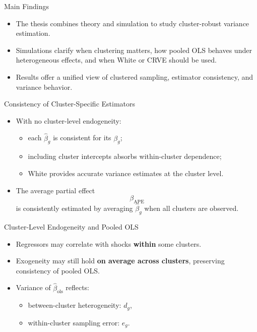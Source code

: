 \documentclass[
  ignorenonframetext,
]{beamer}
\providecommand{\tightlist}{%
  \setlength{\itemsep}{0pt}\setlength{\parskip}{0pt}}
\begin{document}
\begin{frame}{Main Findings}
\label{main-findings}
\begin{itemize}
\tightlist
\item
  The thesis combines theory and simulation to study cluster-robust
  variance estimation.\\
\item
  Simulations clarify when clustering matters, how pooled OLS behaves
  under heterogeneous effects, and when White or CRVE should be used.\\
\item
  Results offer a unified view of clustered sampling, estimator
  consistency, and variance behavior.
\end{itemize}
\end{frame}

\begin{frame}{Consistency of Cluster-Specific Estimators}
\label{consistency-of-cluster-specific-estimators}
\begin{itemize}
\tightlist
\item
  With no cluster-level endogeneity:

  \begin{itemize}
  \tightlist
  \item
    each \(\hat{\beta}_g\) is consistent for its \(\beta_g\);\\
  \item
    including cluster intercepts absorbs within-cluster dependence;\\
  \item
    White provides accurate variance estimates at the cluster level.
  \end{itemize}
\item
  The average partial effect\\
  \[
  \beta_{\text{APE}}
  \] is consistently estimated by averaging \(\hat{\beta}_g\) when all
  clusters are observed.
\end{itemize}
\end{frame}

\begin{frame}{Cluster-Level Endogeneity and Pooled OLS}
\label{cluster-level-endogeneity-and-pooled-ols}
\begin{itemize}
\tightlist
\item
  Regressors may correlate with shocks \textbf{within} some clusters.\\
\item
  Exogeneity may still hold \textbf{on average across clusters},
  preserving consistency of pooled OLS.
\item
  Variance of \(\hat{\beta}_{\text{ols}}\) reflects:

  \begin{itemize}
  \tightlist
  \item
    between-cluster heterogeneity: \(d_g\),\\
  \item
    within-cluster sampling error: \(e_g\).
  \end{itemize}
\end{itemize}
\end{frame}
\end{document}
